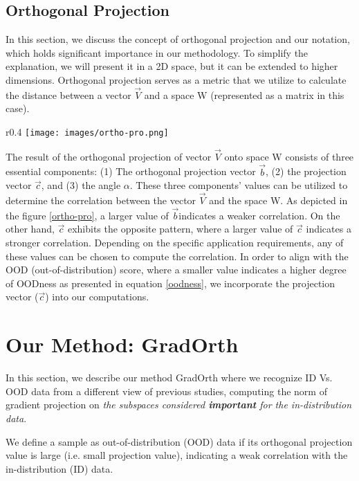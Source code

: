 \documentclass{article}
\begin{document}
\subsection{Orthogonal Projection}\vspace{-2mm}
In this section, we discuss the concept of orthogonal projection and our notation, which holds significant importance in our methodology. To simplify the explanation, we will present it in a 2D space, but it can be extended to higher dimensions. Orthogonal projection serves as a metric that we utilize to calculate the distance between a vector $\overrightarrow{V}$ and a space W (represented as a matrix in this case).
\begin{wrapfigure}{r}{0.4\textwidth}\vspace{-2mm}
\texttt{[image: images/ortho-pro.png]}
  \caption{ Orthogonal Projection}
  \label{ortho-pro}
  \vspace{-5.6mm}
\end{wrapfigure}
The result of the orthogonal projection of vector $\overrightarrow{V}$ onto space W consists of three essential components:
(1) The orthogonal projection vector $\overrightarrow{b}$,
(2) the projection vector $\overrightarrow{c}$,
and (3) the angle $\alpha$.
These three components' values can be utilized to determine the correlation between the vector $\overrightarrow{V}$ and the space W. As depicted in the figure \ref{ortho-pro}, a larger value of $\overrightarrow{b}$indicates a weaker correlation. On the other hand, $\overrightarrow{c}$ exhibits the opposite pattern, where a larger value of $\overrightarrow{c}$ indicates a stronger correlation. Depending on the specific application requirements, any of these values can be chosen to compute the correlation.
In order to align with the OOD (out-of-distribution) score, where a smaller value indicates a higher degree of OODness as presented in equation \ref{oodness}, we incorporate the projection vector ($\overrightarrow{\textit{c}}$) into our computations.
\section{Our Method: GradOrth}\vspace{-0.2cm}
In this section, we describe our method GradOrth where we recognize ID Vs. OOD data from a different view of previous studies, computing the norm of gradient projection on \textit{the subspaces considered \textbf{important} for the in-distribution data}.

 We define a sample as out-of-distribution (OOD) data if its orthogonal projection value is large (i.e. small projection value), indicating a weak correlation with the in-distribution (ID) data.
\end{document}
